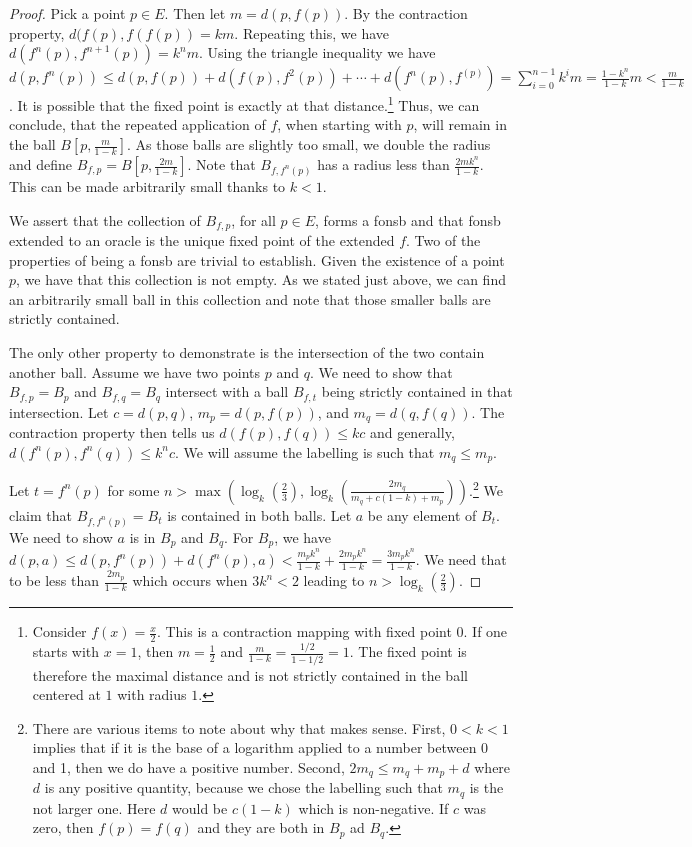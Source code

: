 \documentclass[12pt]{article}
\begin{document}
\begin{proof}
    Pick a point $p \in E$. Then let $m = d(p, f(p) )$. By the contraction property, $d(f(p), f(f(p)) = km$. Repeating this, we have $d(f^n(p), f^{n+1}(p) )  = k^n m$. Using the triangle inequality we have $d(p, f^n(p)) \leq d(p, f(p)) + d(f(p), f^2(p)) + \cdots + d(f^n(p), f^(p) ) = \sum_{i=0}^{n-1} k^i m = \frac{1-k^{n}}{1-k} m  < \frac{m}{1-k}$. It is possible that the fixed point is exactly at that distance.\footnote{Consider $f(x) = \frac{x}{2}$. This is a contraction mapping with fixed point $0$. If one starts with $x=1$, then $m=\frac{1}{2}$ and $\frac{m}{1-k} = \frac{1/2}{1 - 1/2} = 1$. The fixed point is therefore the maximal distance and is not strictly contained in the ball centered at $1$ with radius $1$.} Thus, we can conclude, that the repeated application of $f$, when starting with $p$, will remain in the ball $B[p, \frac{m}{1-k}]$. As those balls are slightly too small, we double the radius and define $B_{f,p} = B[p, \frac{2m}{1-k}]$. Note that $B_{f,f^n(p)}$ has a radius less than $\frac{2 m k^n}{1-k}$. This can be made arbitrarily small thanks to $k < 1$.
    
    We assert that the collection of $B_{f,p}$, for all $p \in E$, forms a fonsb and that fonsb extended to an oracle is the unique fixed point of the extended $f$. Two of the properties of being a fonsb are trivial to establish.  Given the existence of a point $p$, we have that this collection is not empty. As we stated just above, we can find an arbitrarily small ball in this collection and note that those smaller balls are strictly contained.

    The only other property to demonstrate is the intersection of the two contain another ball.  Assume we have two points $p$ and $q$. We need to show that $B_{f, p} = B_p$ and $B_{f, q}= B_q$ intersect with a ball $B_{f, t}$ being strictly contained in that intersection. Let $c = d(p,q)$, $m_p = d(p, f(p))$, and $m_q = d(q, f(q))$. The contraction property then tells us $d(f(p), f(q)) \leq kc$ and generally, $d(f^n(p), f^n(q)) \leq k^n c$. We will assume the labelling is such that $m_q \leq m_p$. 

    Let $t = f^n(p)$ for some $n >  \max( \log_k( \frac{2}{3}), \log_k (\frac{2m_q}{m_q +c(1-k) + m_p} ) )$.\footnote{There are various items to note about why that makes sense. First, $0  < k <1$ implies that if it is the base of a logarithm applied to a number between 0 and 1, then we do have a positive number. Second, $2m_q \leq m_q + m_p + d$ where $d$ is any positive quantity, because we chose the labelling such that $m_q$ is the not larger one. Here $d$ would be $c(1-k)$ which is non-negative. If $c$ was zero, then $f(p) = f(q)$ and they are both in $B_p$ ad $B_q$.} We claim that $B_{f, f^n(p)} = B_t$ is contained in both balls. Let $a$ be any element of $B_t$. We need to show $a$ is in $B_p$ and $B_q$. For $B_p$, we have $d(p, a) \leq d(p, f^n(p)) + d(f^n(p), a) < \frac{m_p k^n}{1-k} + \frac{2m_p k^n}{1-k} = \frac{3m_p k^n}{1-k}$.  We need that to be less than $\frac{2 m_p}{1-k}$ which occurs when $3 k^n < 2$ leading to $n > \log_k (\frac{2}{3}) $. 


\end{proof}
\end{document}
